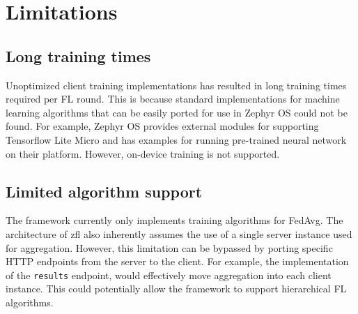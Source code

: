 \documentclass[12pt]{article}
\begin{document}
\section{Limitations}
\subsection{Long training times}
Unoptimized client training implementations has resulted in long training times required per FL
round. This is because standard implementations for machine learning
algorithms that can be easily ported for use in Zephyr OS could not be found. For example, Zephyr OS provides external modules
for supporting Tensorflow Lite Micro\cite{tensorflow2015-whitepaper} and has examples for running pre-trained neural network
on their platform. However, on-device training is not supported.

\subsection{Limited algorithm support}
The framework currently only implements training algorithms for FedAvg. The architecture of zfl also
inherently assumes the use of a single server instance used for aggregation. However, this
limitation can be bypassed by porting specific HTTP endpoints from the server to the client. For
example, the implementation of the \verb|results| endpoint, would effectively move aggregation into
each client instance. This could potentially allow the framework to support hierarchical FL algorithms\cite{rana_2023_hierarchical}.


\pagebreak


\end{document}
